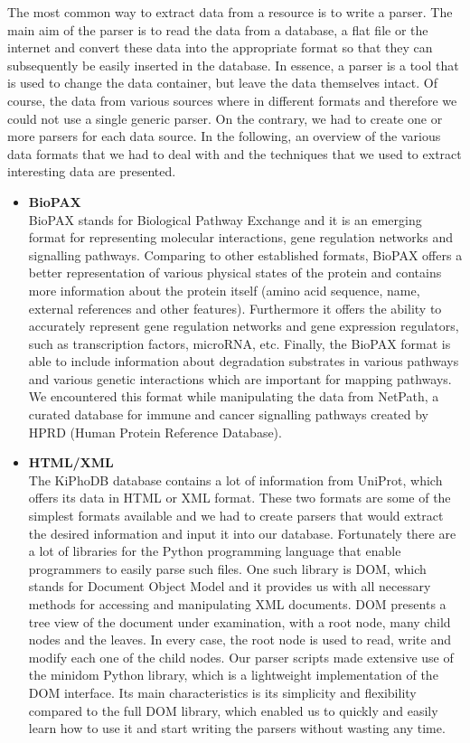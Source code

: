The most common way to extract data from a resource is to write a parser.
The main aim of the parser is to read the data from a database, a flat file or the internet and convert these data into the appropriate format so that they can subsequently be easily inserted in the database.
In essence, a parser is a tool that is used to change the data container, but leave the data themselves intact.
Of course, the data from various sources where in different formats and therefore we could not use a single generic parser.
On the contrary, we had to create one or more parsers for each data source.
In the following, an overview of the various data formats that we had to deal with and the techniques that we used to extract interesting data are presented.

\begin{itemize}
\item \textbf{BioPAX} \\
BioPAX stands for Biological Pathway Exchange and it is an emerging format for representing molecular interactions, gene regulation networks and signalling pathways.
Comparing to other established formats, BioPAX offers a better representation of various physical states of the protein and contains more information about the protein itself (amino acid sequence, name, external references and other features).
Furthermore it offers the ability to accurately represent gene regulation networks and gene expression regulators, such as transcription factors, microRNA, etc.
Finally, the BioPAX format is able to include information about degradation substrates in various pathways and various genetic interactions which are important for mapping pathways.
We encountered this format while manipulating the data from NetPath, a curated database for immune and cancer signalling pathways created by HPRD (Human Protein Reference Database).

\item \textbf{HTML/XML} \\
The KiPhoDB database contains a lot of information from UniProt, which offers its data in HTML or XML format.
These two formats are some of the simplest formats available and we had to create parsers that would extract the desired information and input it into our database.
Fortunately there are a lot of libraries for the Python programming language that enable programmers to easily parse such files.
One such library is DOM, which stands for Document Object Model and it provides us with all necessary methods for accessing and manipulating XML documents.
DOM presents a tree view of the document under examination, with a root node, many child nodes and the leaves.
In every case, the root node is used to read, write and modify each one of the child nodes.
Our parser scripts made extensive use of the minidom Python library, which is a lightweight implementation of the DOM interface.
Its main characteristics is its simplicity and flexibility compared to the full DOM library, which enabled us to quickly and easily learn how to use it and start writing the parsers without wasting any time.


\end{itemize}
